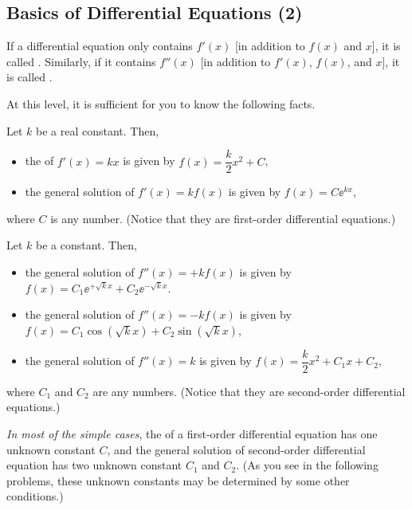 \documentclass[11pt,pdfa,lastpage]{MishoNote}
\newcommand\starskip{\bigskip\begin{center}\pgfornament[width=7cm]{88}\end{center}\medskip}
\begin{document}
\newpage

\subsection{Basics of Differential Equations (2)}
If a differential equation only contains $f'(x)$ [in addition to $f(x)$ and $x$], it is called .
Similarly, if it contains $f''(x)$ [in addition to $f'(x)$, $f(x)$, and $x$], it is called .

At this level, it is sufficient for you to know the following facts.
\begin{theorem}{}{}
  Let $k$ be a real constant. Then,
\begin{itemize}
  \item the  of $\displaystyle f'(x) = kx$ is given by $f(x)=\dfrac{k}{2}x^2+C$,
  \item the {general solution} of $\displaystyle f'(x) = kf(x)$ is given by $f(x)=C\ee^{kx}$,
\end{itemize}
where $C$ is any number. (Notice that they are first-order differential equations.)
\end{theorem}
\begin{theorem}{}{}
  Let $k$ be a  constant. Then,
\begin{itemize}
  \item the general solution of $\displaystyle f''(x) = +kf(x)$ is given by $f(x)=C_1\ee^{+\sqrt{k}x}+C_2\ee^{-\sqrt kx}$.
  \item the general solution of $\displaystyle f''(x) = -kf(x)$ is given by $f(x)=C_1\cos(\sqrt k x)+C_2\sin(\sqrt kx)$,
  \item the general solution of $\displaystyle f''(x) = k$ is given by $f(x)=\dfrac{k}{2}x^2+C_1x+C_2$,
\end{itemize}
where $C_1$ and $C_2$ are any numbers. (Notice that they are second-order differential equations.)
\end{theorem}
\emph{In most of the simple cases}, the  of a first-order differential equation has one unknown constant $C$, and the general solution of second-order differential equation has two unknown constant $C_1$ and $C_2$.
(As you see in the following problems, these unknown constants may be determined by some other conditions.)


\starskip
\end{document}
